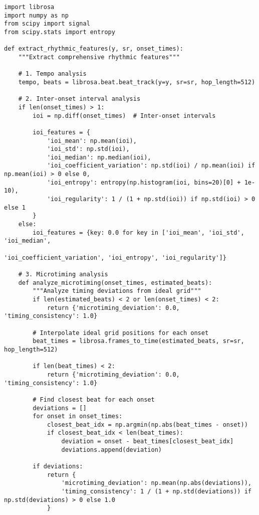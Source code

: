 \documentclass[12pt]{article}
\begin{document}
\begin{verbatim}
import librosa
import numpy as np
from scipy import signal
from scipy.stats import entropy

def extract_rhythmic_features(y, sr, onset_times):
    """Extract comprehensive rhythmic features"""
    
    # 1. Tempo analysis
    tempo, beats = librosa.beat.beat_track(y=y, sr=sr, hop_length=512)
    
    # 2. Inter-onset interval analysis
    if len(onset_times) > 1:
        ioi = np.diff(onset_times)  # Inter-onset intervals
        
        ioi_features = {
            'ioi_mean': np.mean(ioi),
            'ioi_std': np.std(ioi),
            'ioi_median': np.median(ioi),
            'ioi_coefficient_variation': np.std(ioi) / np.mean(ioi) if np.mean(ioi) > 0 else 0,
            'ioi_entropy': entropy(np.histogram(ioi, bins=20)[0] + 1e-10),
            'ioi_regularity': 1 / (1 + np.std(ioi)) if np.std(ioi) > 0 else 1
        }
    else:
        ioi_features = {key: 0.0 for key in ['ioi_mean', 'ioi_std', 'ioi_median', 
                                            'ioi_coefficient_variation', 'ioi_entropy', 'ioi_regularity']}
    
    # 3. Microtiming analysis
    def analyze_microtiming(onset_times, estimated_beats):
        """Analyze timing deviations from ideal grid"""
        if len(estimated_beats) < 2 or len(onset_times) < 2:
            return {'microtiming_deviation': 0.0, 'timing_consistency': 1.0}
        
        # Interpolate ideal grid positions for each onset
        beat_times = librosa.frames_to_time(estimated_beats, sr=sr, hop_length=512)
        
        if len(beat_times) < 2:
            return {'microtiming_deviation': 0.0, 'timing_consistency': 1.0}
        
        # Find closest beat for each onset
        deviations = []
        for onset in onset_times:
            closest_beat_idx = np.argmin(np.abs(beat_times - onset))
            if closest_beat_idx < len(beat_times):
                deviation = onset - beat_times[closest_beat_idx]
                deviations.append(deviation)
        
        if deviations:
            return {
                'microtiming_deviation': np.mean(np.abs(deviations)),
                'timing_consistency': 1 / (1 + np.std(deviations)) if np.std(deviations) > 0 else 1.0
            }
        

\end{verbatim}
\end{document}

